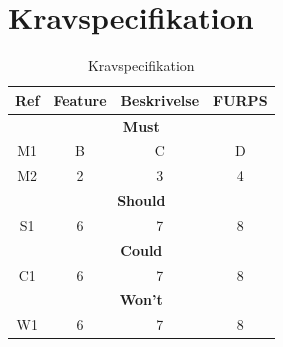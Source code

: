 \section{Kravspecifikation}

\begin{table}[h]
\centering
\begin{tabular}{|c|c|c|c|}

\hline
Ref & Feature & Beskrivelse & FURPS \\
\hline


\multicolumn{4}{|c|}{\textbf{Must}} \\
\hline
M1 & B & C & D \\
\hline
M2 & 2 & 3 & 4 \\
\hline

\multicolumn{4}{|c|}{\textbf{Should}} \\
\hline
S1 & 6 & 7 & 8 \\
\hline

\multicolumn{4}{|c|}{\textbf{Could}} \\
\hline
C1 & 6 & 7 & 8 \\
\hline

\multicolumn{4}{|c|}{\textbf{Won't}} \\
\hline
W1 & 6 & 7 & 8 \\
\hline

\end{tabular}
\caption{Kravspecifikation}
\end{table}